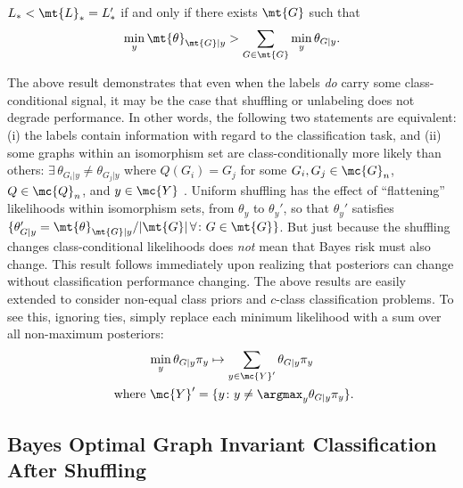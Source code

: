 \documentclass[10pt,journal,cspaper,compsoc]{IEEEtran}
\newcommand{\Qs}{Q}
\begin{document}
\begin{thm} \label{thm:2}
	$L_* < \mt{L}_*=L'_*$ if and only if there exists $\mt{G}$ such that
	$$\min_y \mt{\theta}_{\mt{G}|y} > \sum_{G \in \mt{G}}\min_y \theta_{G|y}.$$
\end{thm}
The above result demonstrates that even when the labels \emph{do} carry some class-conditional signal, it may be the case that shuffling or unlabeling does not degrade performance.  In other words, the following two statements are equivalent: (i) the labels contain information with regard to the classification task, and (ii) some graphs within an isomorphism set are class-conditionally more likely than others: $\exists \, \theta_{G_i|y} \neq \theta_{G_j|y}$ where $\Qs(G_i)=G_j$ for some $G_i,G_j \in \mc{G}_n$, $\Qs \in \mc{Q}_n$, and $y \in \mc{Y}$%
.  Uniform shuffling has the effect of ``flattening'' likelihoods within isomorphism sets, from $\theta_y$ to $\theta_y'$, so that $\theta_y'$ satisfies $\{\theta_{G|y}'=\mt{\theta}_{\mt{G}|y}/|\mt{G}| \, \forall \colon G \in \mt{G}\}$.  But just because the shuffling changes class-conditional likelihoods does \emph{not} mean that Bayes risk must also change. This result follows immediately upon realizing that posteriors can change without classification performance changing.  The above results are easily extended to consider non-equal class priors and $c$-class classification problems.  To see this, ignoring ties, simply replace each minimum likelihood with a sum over all non-maximum posteriors: 
\begin{multline}
\min_y \theta_{G|y} \pi_y \mapsto \sum_{y \in \mc{Y}'} \theta_{G|y} \pi_y \\ \text{ where } \mc{Y}' =\{y \colon y \neq \argmax_y \theta_{G|y} \pi_y\}.
\end{multline}

\subsection{Bayes Optimal Graph Invariant Classification After Shuffling} %
\label{sec:gi}
\end{document}
